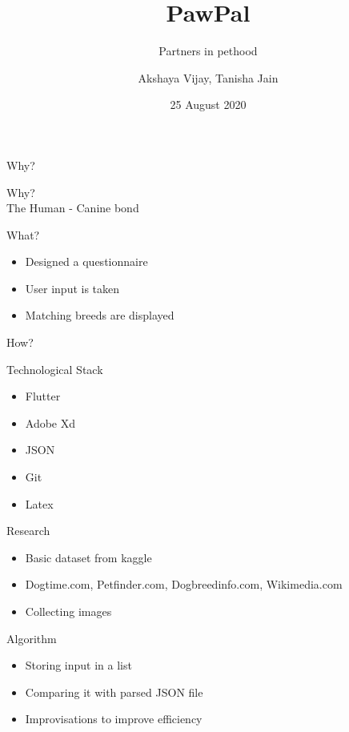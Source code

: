 \documentclass[14pt]{beamer}
\title[Pawpal]{PawPal}
\subtitle[Partners of pethood]{Partners in pethood}
\author[Team 42]{Akshaya Vijay, Tanisha Jain}
\date{25 August 2020}
\begin{document}
\begin{frame}
    \titlepage
\end{frame}


\begin{frame}[standout]
   Why?
\end{frame}

\begin{frame}[standout]
   Why?
   \\The Human - Canine bond
\end{frame}

\begin{frame}[standout]
   What?
\end{frame}

\begin{frame}
    \begin{itemize}
        \item Designed a questionnaire 
        \item User input is taken
        \item Matching breeds are displayed
    \end{itemize}
\end{frame}

\begin{frame}[standout]
   How?
\end{frame}

\begin{frame}{Technological Stack}
    \begin{itemize}
        \item Flutter
        \item Adobe Xd
        \item JSON
        \item Git
        \item Latex
    \end{itemize}
\end{frame}

\begin{frame}{Research}
    \begin{itemize}
        \item Basic dataset from kaggle
        \item Dogtime.com, Petfinder.com, Dogbreedinfo.com, Wikimedia.com
        \item Collecting images 
    \end{itemize}
\end{frame}

\begin{frame}{Algorithm}
    \begin{itemize}
        \item Storing input in a list
        \item Comparing it with parsed JSON file
        \item Improvisations to improve efficiency 
    \end{itemize}
\end{frame}
\end{document}
